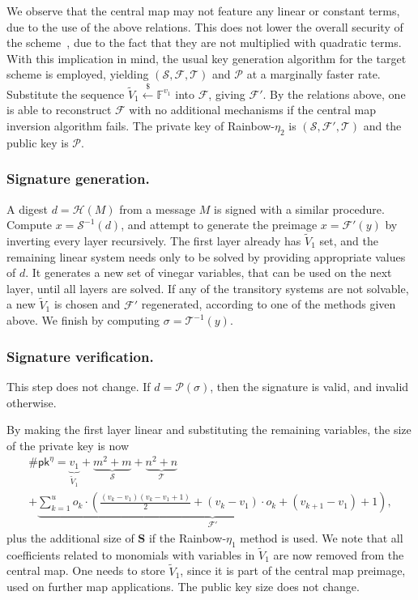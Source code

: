 \documentclass[draft, 12pt, a4paper, oneside]{memoir}
\newcommand{\random}{\stackrel{\$}{\longleftarrow}}
\theoremstyle{definition}
\begin{document}
We observe that the central map may not feature any linear or constant terms, due
to the use of the above relations. This does not lower the overall security of
the scheme~\cite{}, due to the fact that they are not multiplied with quadratic terms.
With this implication in mind, the usual key generation algorithm for the
target scheme is employed, yielding $(\mathcal{S}, \mathcal{F}, \mathcal{T})$
and $\mathcal{P}$ at a marginally faster rate. Substitute the sequence
$\widetilde{V}_{1} \random \mathbb{F}^{v_{1}}$ into $\mathcal{F}$, giving
$\mathcal{F'}$. By the relations above, one is able to reconstruct
$\mathcal{F}$ with no additional mechanisms if the central map inversion
algorithm fails. The private key of Rainbow-$\eta_{2}$ is
$(\mathcal{S}, \mathcal{F}', \mathcal{T})$ and the public key is $\mathcal{P}$.

\subsubsection{Signature generation.}

A digest $d = \mathcal{H}(M)$ from a message $M$ is signed with a similar
procedure. Compute $x = \mathcal{S}^{-1}(d)$, and attempt to generate the preimage
$x = \mathcal{F}'(y)$ by inverting every layer recursively. The first
layer already has $\widetilde{V}_{1}$ set, and the remaining linear system
needs only to be solved by providing appropriate values of $d$. It
generates a new set of vinegar variables, that can be used on the next layer,
until all layers are solved. If any of the transitory systems are not solvable,
a new $\widetilde{V}_{1}$ is chosen and $\mathcal{F}'$ regenerated, according
to one of the methods given above. We finish by computing
$\sigma = \mathcal{T}^{-1}(y)$.

\subsubsection{Signature verification.}

This step does not change. If $d = \mathcal{P}(\sigma)$, then the signature is
valid, and invalid otherwise.

By making the first layer linear and substituting the remaining variables, the
size of the private key is now
\begin{multline}
  \#\mathsf{pk}^{\eta} = \underbrace{v_{1}}_{\widetilde{V}_{1}}
    + \underbrace{m^{2} + m}_{\mathcal{S}}
    + \underbrace{n^{2} + n}_{\mathcal{T}} \\
    + \underbrace{\sum_{k = 1}^{u} o_{k} \cdot \left( \frac{(v_{k} - v_{1})(v_{k} - v_{1} + 1)}{2}
      + (v_{k} - v_{1}) \cdot o_{k} + (v_{k + 1} - v_{1}) + 1 \right)}_{\mathcal{F}'},
\end{multline}
plus the additional size of $\mathbf{S}$ if the Rainbow-$\eta_{1}$ method is
used. We note that all coefficients related to monomials with variables in $\widetilde{V}_{1}$ are now removed from the central map. One needs to store $\widetilde{V}_{1}$, since it is part of the central
map preimage, used on further map applications. The public key size does not
change.
\end{document}
